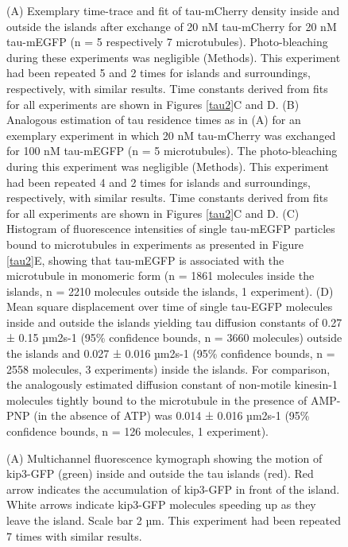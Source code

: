 \begin{figure}[h!tb]
\centering
\caption[Supplementary figure for: Tau molecules in the islands are stationary but exchange with tau in solution.]{
(A) Exemplary time-trace and fit of tau-mCherry density inside and outside the islands after exchange of 20 nM tau-mCherry for 20 nM tau-mEGFP (n = 5 respectively 7 microtubules). Photo-bleaching during these experiments was negligible (Methods). This experiment had been repeated 5 and 2 times for islands and surroundings, respectively, with similar results. Time constants derived from fits for all experiments are shown in Figures \ref{tau2}C and D. (B) Analogous estimation of tau residence times as in (A) for an exemplary experiment in which 20 nM tau-mCherry was exchanged for 100 nM tau-mEGFP (n = 5 microtubules). The photo-bleaching during this experiment was negligible (Methods). This experiment had been repeated 4 and 2 times for islands and surroundings, respectively, with similar results. Time constants derived from fits for all experiments are shown in Figures \ref{tau2}C and D. (C) Histogram of fluorescence intensities of single tau-mEGFP particles bound to microtubules in experiments as presented in Figure \ref{tau2}E, showing that tau-mEGFP is associated with the microtubule in monomeric form (n = 1861 molecules inside the islands, n = 2210 molecules outside the islands, 1 experiment). (D) Mean square displacement over time of single tau-EGFP molecules inside and outside the islands yielding tau diffusion constants of 0.27 ± 0.15 µm2s-1 (95\% confidence bounds, n = 3660 molecules) outside the islands and 0.027  ± 0.016 µm2s-1 (95\% confidence bounds, n = 2558 molecules, 3 experiments) inside the islands. For comparison, the analogously estimated diffusion constant of non-motile kinesin-1 molecules tightly bound to the microtubule in the presence of AMP-PNP (in the absence of ATP) was 0.014 ± 0.016 µm2s-1 (95\% confidence bounds, n = 126 molecules, 1 experiment).
	}\label{tau_s2}
\end{figure}
\begin{figure}[h!tb]
\centering
\caption[Supplementary figure for: Tau islands are distinguished by tau cohesion.]{ (A) Multichannel fluorescence kymograph showing the motion of kip3-GFP (green) inside and outside the tau islands (red). Red arrow indicates the accumulation of kip3-GFP in front of the island. White arrows indicate kip3-GFP molecules speeding up as they leave the island. Scale bar 2 µm. This experiment had been repeated 7 times with similar results. 
	}\label{tau_s4}
\end{figure}

